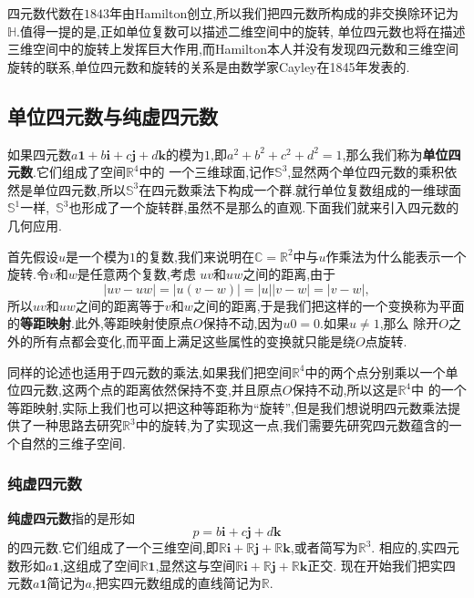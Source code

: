 \documentclass[10pt,a4paper]{ctexbook}
\theoremstyle{definition}
\begin{document}
四元数代数在$1843$年由Hamilton创立,所以我们把四元数所构成的非交换除环记为$\mathbb{H}$.值得一提的是,正如单位复数可以描述二维空间中的旋转,%
单位四元数也将在描述三维空间中的旋转上发挥巨大作用,而Hamilton本人并没有发现四元数和三维空间旋转的联系,单位四元数和旋转的关系是由数学家Cayley在1845年发表的.

\subsection{单位四元数与纯虚四元数}
如果四元数$a\mathbf{1}+b\mathbf{i}+c\mathbf{j}+d\mathbf{k}$的模为$1$,即$a^2+b^2+c^2+d^2=1$,那么我们称为\textbf{单位四元数}.它们组成了空间$\mathbb{R}^4$中的%
一个三维球面,记作$\mathbb{S}^3$,显然两个单位四元数的乘积依然是单位四元数,所以$\mathbb{S}^3$在四元数乘法下构成一个群.就行单位复数组成的一维球面$\mathbb{S}^1$一样,%
\,$\mathbb{S}^3$也形成了一个旋转群,虽然不是那么的直观.下面我们就来引入四元数的几何应用.

首先假设$u$是一个模为$1$的复数,我们来说明在$\mathbb{C}=\mathbb{R}^2$中与$u$作乘法为什么能表示一个旋转.令$v$和$w$是任意两个复数,考虑%
$uv$和$uw$之间的距离,由于
\[
    |uv-uw|=|u(v-w)|=|u||v-w|=|v-w|,
\]
所以$uv$和$uw$之间的距离等于$v$和$w$之间的距离,于是我们把这样的一个变换称为平面的\textbf{等距映射}.此外,等距映射使原点$O$保持不动,因为$u0=0$.如果$u\neq 1$,那么%
除开$O$之外的所有点都会变化,而平面上满足这些属性的变换就只能是绕$O$点旋转.

同样的论述也适用于四元数的乘法,如果我们把空间$\mathbb{R}^4$中的两个点分别乘以一个单位四元数,这两个点的距离依然保持不变,并且原点$O$保持不动,所以这是$\mathbb{R}^4$中%
的一个等距映射,实际上我们也可以把这种等距称为``旋转'',但是我们想说明四元数乘法提供了一种思路去研究$\mathbb{R}^3$中的旋转,为了实现这一点,我们需要先研究四元数蕴含的一个自然的三维子空间.

\subsubsection*{纯虚四元数}

\textbf{纯虚四元数}指的是形如
\[
    p=b\mathbf{i}+c\mathbf{j}+d\mathbf{k}
\]
的四元数.它们组成了一个三维空间,即$\mathbb{R}\mathbf{i}+\mathbb{R}\mathbf{j}+\mathbb{R}\mathbf{k}$,或者简写为$\mathbb{R}^3$.%
相应的,实四元数形如$a\mathbf{1}$,这组成了空间$\mathbb{R}\mathbf{1}$,显然这与空间$\mathbb{R}\mathbf{i}+\mathbb{R}\mathbf{j}+\mathbb{R}\mathbf{k}$正交.%
现在开始我们把实四元数$a\mathbf{1}$简记为$a$,把实四元数组成的直线简记为$\mathbb{R}$.
\end{document}
